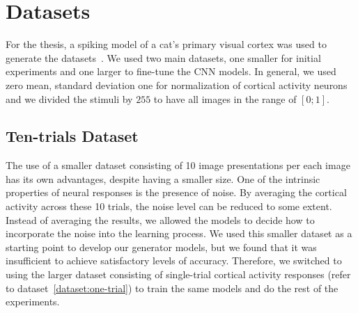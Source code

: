 \chapter{Datasets}
\label{dataset}
For the thesis, a spiking model of a cat's primary visual cortex was used to generate the datasets~\citep{antolik2018comprehensive}. We used two main datasets, one smaller for initial experiments and one larger to fine-tune the CNN models. In general, we used zero mean, standard deviation one for normalization of cortical activity neurons and we divided the stimuli by $255$ to have all images in the range of $[0;1]$.


\section{Ten-trials Dataset}
\label{dataset:ten-trials}
The use of a smaller dataset consisting of 10 image presentations per each image has its own advantages, despite having a smaller size. One of the intrinsic properties of neural responses is the presence of noise. By averaging the cortical activity across these 10 trials, the noise level can be reduced to some extent. Instead of averaging the results, we allowed the models to decide how to incorporate the noise into the learning process. We used this smaller dataset as a starting point to develop our generator models, but we found that it was insufficient to achieve satisfactory levels of accuracy. Therefore, we switched to using the larger dataset consisting of single-trial cortical activity responses (refer to dataset~\ref{dataset:one-trial}) to train the same models and do the rest of the experiments.


